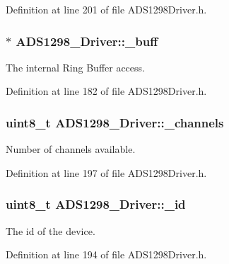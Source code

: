 \-Definition at line 201 of file \-A\-D\-S1298\-Driver.\-h.

\hypertarget{class_a_d_s1298___driver_ac53513e960f78b5ca0713288e410d7d8}{
\subsubsection[{\-\_\-buff}]{$\ast$ {\bf \-A\-D\-S1298\-\_\-\-Driver\-::\-\_\-buff}}}\label{class_a_d_s1298___driver_ac53513e960f78b5ca0713288e410d7d8}


\-The internal \-Ring \-Buffer access. 



\-Definition at line 182 of file \-A\-D\-S1298\-Driver.\-h.

\hypertarget{class_a_d_s1298___driver_a3f9749dd1e5189a86a513dd654a2bd56}{
\subsubsection[{\-\_\-channels}]{\setlength{\rightskip}{0pt plus 5cm}uint8\-\_\-t {\bf \-A\-D\-S1298\-\_\-\-Driver\-::\-\_\-channels}}}\label{class_a_d_s1298___driver_a3f9749dd1e5189a86a513dd654a2bd56}


\-Number of channels available. 



\-Definition at line 197 of file \-A\-D\-S1298\-Driver.\-h.

\hypertarget{class_a_d_s1298___driver_ae61d4626ed0d4fbd566a5a80baa69da6}{
\subsubsection[{\-\_\-id}]{\setlength{\rightskip}{0pt plus 5cm}uint8\-\_\-t {\bf \-A\-D\-S1298\-\_\-\-Driver\-::\-\_\-id}}}\label{class_a_d_s1298___driver_ae61d4626ed0d4fbd566a5a80baa69da6}


\-The id of the device. 



\-Definition at line 194 of file \-A\-D\-S1298\-Driver.\-h.

